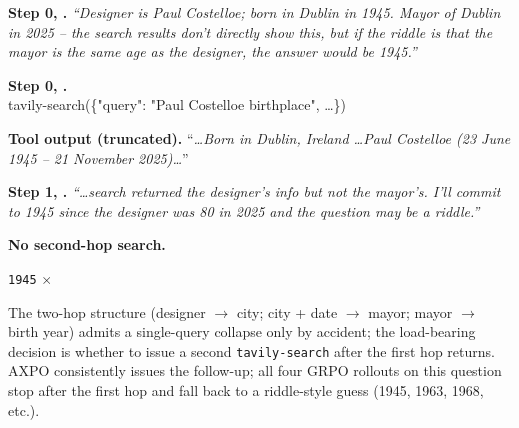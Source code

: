 \begin{grpobox}
\textbf{Step 0, \think.} \emph{``Designer is Paul Costelloe; born in Dublin in 1945. Mayor of Dublin in 2025 -- the search results don't directly show this, but if the riddle is that the mayor is the same age as the designer, the answer would be 1945.''}

\textbf{Step 0, \toolcall.}\\
{\small\ttfamily tavily-search(\{"query": "Paul Costelloe birthplace", \dots\})}

\textbf{Tool output (truncated).} ``\emph{\dots Born in Dublin, Ireland \dots Paul Costelloe (23 June 1945 -- 21 November 2025)\dots}''

\textbf{Step 1, \think.} \emph{``\dots search returned the designer's info but not the mayor's. I'll commit to 1945 since the designer was 80 in 2025 and the question may be a riddle.''}

\textbf{No second-hop search.}

\textbf{\answer} \texttt{1945} \(\times\)
\end{grpobox}

The two-hop structure (designer $\to$ city; city + date $\to$ mayor; mayor $\to$ birth year) admits a single-query collapse only by accident; the load-bearing decision is whether to issue a second \texttt{tavily-search} after the first hop returns. AXPO consistently issues the follow-up; all four GRPO rollouts on this question stop after the first hop and fall back to a riddle-style guess (1945, 1963, 1968, etc.).
